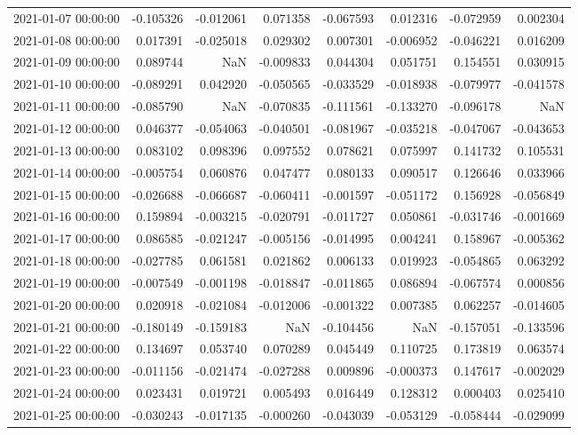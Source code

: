 \begin{tabular}{lrrrrrrr}
2021-01-07 00:00:00 & -0.105326 & -0.012061 & 0.071358 & -0.067593 & 0.012316 & -0.072959 & 0.002304 \\
2021-01-08 00:00:00 & 0.017391 & -0.025018 & 0.029302 & 0.007301 & -0.006952 & -0.046221 & 0.016209 \\
2021-01-09 00:00:00 & 0.089744 & NaN & -0.009833 & 0.044304 & 0.051751 & 0.154551 & 0.030915 \\
2021-01-10 00:00:00 & -0.089291 & 0.042920 & -0.050565 & -0.033529 & -0.018938 & -0.079977 & -0.041578 \\
2021-01-11 00:00:00 & -0.085790 & NaN & -0.070835 & -0.111561 & -0.133270 & -0.096178 & NaN \\
2021-01-12 00:00:00 & 0.046377 & -0.054063 & -0.040501 & -0.081967 & -0.035218 & -0.047067 & -0.043653 \\
2021-01-13 00:00:00 & 0.083102 & 0.098396 & 0.097552 & 0.078621 & 0.075997 & 0.141732 & 0.105531 \\
2021-01-14 00:00:00 & -0.005754 & 0.060876 & 0.047477 & 0.080133 & 0.090517 & 0.126646 & 0.033966 \\
2021-01-15 00:00:00 & -0.026688 & -0.066687 & -0.060411 & -0.001597 & -0.051172 & 0.156928 & -0.056849 \\
2021-01-16 00:00:00 & 0.159894 & -0.003215 & -0.020791 & -0.011727 & 0.050861 & -0.031746 & -0.001669 \\
2021-01-17 00:00:00 & 0.086585 & -0.021247 & -0.005156 & -0.014995 & 0.004241 & 0.158967 & -0.005362 \\
2021-01-18 00:00:00 & -0.027785 & 0.061581 & 0.021862 & 0.006133 & 0.019923 & -0.054865 & 0.063292 \\
2021-01-19 00:00:00 & -0.007549 & -0.001198 & -0.018847 & -0.011865 & 0.086894 & -0.067574 & 0.000856 \\
2021-01-20 00:00:00 & 0.020918 & -0.021084 & -0.012006 & -0.001322 & 0.007385 & 0.062257 & -0.014605 \\
2021-01-21 00:00:00 & -0.180149 & -0.159183 & NaN & -0.104456 & NaN & -0.157051 & -0.133596 \\
2021-01-22 00:00:00 & 0.134697 & 0.053740 & 0.070289 & 0.045449 & 0.110725 & 0.173819 & 0.063574 \\
2021-01-23 00:00:00 & -0.011156 & -0.021474 & -0.027288 & 0.009896 & -0.000373 & 0.147617 & -0.002029 \\
2021-01-24 00:00:00 & 0.023431 & 0.019721 & 0.005493 & 0.016449 & 0.128312 & 0.000403 & 0.025410 \\
2021-01-25 00:00:00 & -0.030243 & -0.017135 & -0.000260 & -0.043039 & -0.053129 & -0.058444 & -0.029099 \\

\end{tabular}
